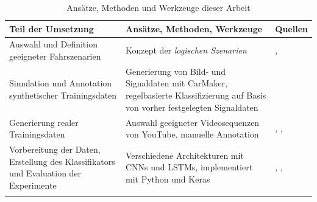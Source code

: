 \begin{longtable}[c]{p{5cm} p{6.5cm} p{1.5cm}}
\textbf{Teil der Umsetzung} & \textbf{Ansätze, Methoden, Werkzeuge} & \textbf{Quellen} \\
\hline
\endhead

Auswahl und Definition geeigneter Fahrszenarien & Konzept der \textit{logischen Szenarien} & \cite{ulbrich2015defining}, \cite{bagschik2017szenarien} \\
\hline
Simulation und Annotation synthetischer Trainingsdaten & Generierung von Bild- und Signaldaten mit CarMaker, regelbasierte Klassifizierung auf Basis von vorher festgelegten Signaldaten & \cite{ipg2018carmaker} \\
\hline
Generierung realer Trainingsdaten & Auswahl geeigneter Videosequenzen von YouTube, manuelle Annotation & \cite{youtube2018video}, \cite{google2018route1}, \cite{google2018route2} \\
\hline
Vorbereitung der Daten, Erstellung des Klassifikators und Evaluation der Experimente & Verschiedene Architekturen mit \acp{CNN} und \acp{LSTM}, implementiert mit Python und Keras & \cite{chollet2015keras}, \cite{lecun2010convolutional}, \cite{hochreiter1997long} \\

\hline
\caption{Ansätze, Methoden und Werkzeuge dieser Arbeit}
\label{tab_konzept_methods}
\end{longtable}




